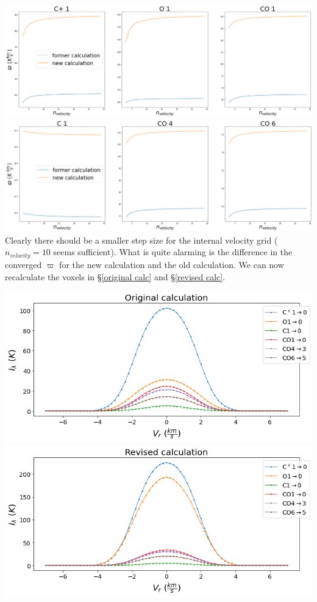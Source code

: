 \documentclass[a4paper]{article}
\begin{document}
    \includegraphics*[width=\linewidth]{voxel_convergence_n_velocity.png} \\

    \includegraphics*[width=\linewidth]{voxel_convergence_n_velocity2.png} \\

    Clearly there should be a smaller step size for the internal velocity grid (\(n_{velocity} = 10\) seems sufficient).
    What is quite alarming is the difference in the converged \(\varpi\) for the new calculation and the old calculation.
    We can now recalculate the voxels in \S \ref{original calc} and \S \ref{revised calc}.


    \includegraphics*[width=\linewidth]{voxel_single-clump_fv_n10.png} \\

    \includegraphics*[width=\linewidth]{voxel_single-clump_fv-calc_n10.png} \\
\end{document}
